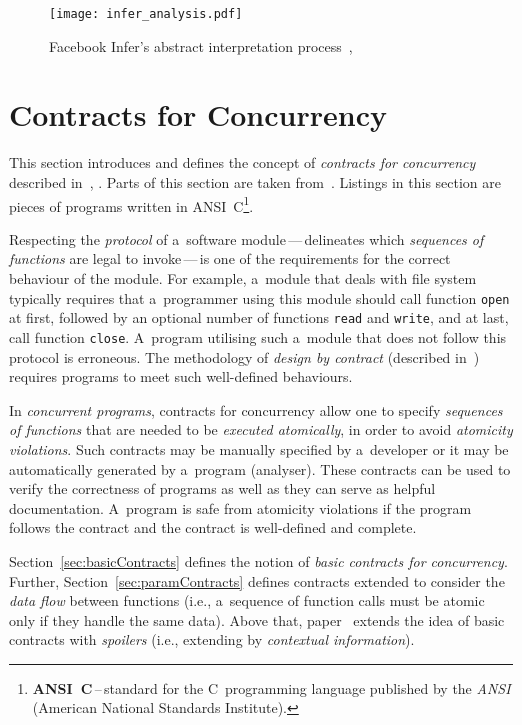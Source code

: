 \begin{figure}[hbt]
    \centering
    \texttt{[image: infer\_analysis.pdf]}
    \caption{%
        Facebook Infer's abstract interpretation
        process~\cite{inferAISlides}, \cite{projectPracticeMarcin2018}
    }
    \label{fig:inferAnalysis}
\end{figure}


\section{Contracts for Concurrency}
\label{sec:contracts}

This section introduces and defines the concept of \emph{contracts for
concurrency} described in~\cite{contracts2015}, \cite{contracts2017}. Parts
of this section are taken from~\cite{excel2019FBInfer}. Listings in this
section are pieces of programs written in ANSI~C\footnote{%
\textbf{ANSI~C}\,--\,standard for the C~programming language published by
the \emph{ANSI} (American National Standards Institute).}.

Respecting the \emph{protocol} of a~software module\,---\,delineates
which \emph{sequences of functions} are legal to invoke\,---\,is one of the
requirements for the correct behaviour of the module. For example, a~module
that deals with file system typically requires that a~programmer using
this module should call function \texttt{open} at first, followed by an
optional number of functions \texttt{read} and \texttt{write}, and at last,
call function \texttt{close}. A~program utilising such a~module that does
not follow this protocol is erroneous. The methodology of \emph{design by
contract} (described in~\cite{contract}) requires programs to meet
such well-defined behaviours.~\cite{contracts2015}

In \emph{concurrent programs}, contracts for concurrency allow one to specify
\emph{sequences of functions} that are needed to be \emph{executed
atomically}, in order to avoid \emph{atomicity violations}. Such contracts
may be manually specified by a~developer or it may be automatically generated
by a~program (analyser). These contracts can be used to verify the correctness
of programs as well as they can serve as helpful documentation. A~program is
safe from atomicity violations if the program follows the contract and
the contract is well-defined and complete.

Section~\ref{sec:basicContracts} defines the notion of \emph{basic contracts
for concurrency}. Further, Section~\ref{sec:paramContracts} defines
contracts extended to consider the \emph{data flow} between functions (i.e.,
a~sequence of function calls must be atomic only if they handle the
same data). Above that, paper~\cite{contracts2017} extends the idea
of basic contracts with \emph{spoilers} (i.e., extending by
\emph{contextual information}).


